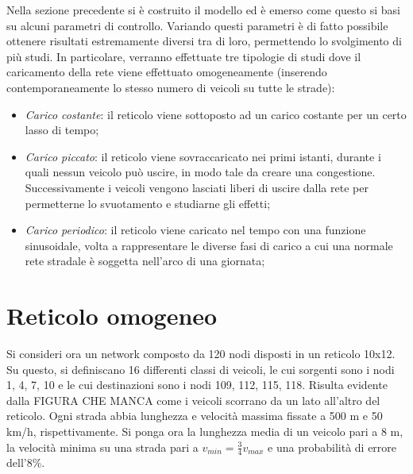 \documentclass[../main.tex]{subfiles}
\begin{document}
Nella sezione precedente si \`e costruito il modello ed \`e emerso come questo si basi su alcuni parametri di controllo.
Variando questi parametri \`e di fatto possibile ottenere risultati estremamente diversi tra di loro, permettendo lo svolgimento di pi\`u studi.
In particolare, verranno effettuate tre tipologie di studi dove il caricamento della rete viene effettuato omogeneamente (inserendo contemporaneamente lo stesso numero di veicoli su tutte le strade):
\begin{itemize}
    \item \emph{Carico costante}: il reticolo viene sottoposto ad un carico costante per un certo lasso di tempo;
    \item \emph{Carico piccato}: il reticolo viene sovraccaricato nei primi istanti, durante i quali nessun veicolo pu\`o uscire, in modo tale da creare una congestione. Successivamente i veicoli vengono lasciati liberi di uscire dalla rete per permetterne lo svuotamento e studiarne gli effetti;
    \item \emph{Carico periodico}: il reticolo viene caricato nel tempo con una funzione sinusoidale, volta a rappresentare le diverse fasi di carico a cui una normale rete stradale \`e soggetta nell'arco di una giornata;
\end{itemize}

\section{Reticolo omogeneo}
Si consideri ora un network composto da 120 nodi disposti in un reticolo 10x12.
Su questo, si definiscano 16 differenti classi di veicoli, le cui sorgenti sono i nodi 1, 4, 7, 10 e le cui destinazioni sono i nodi 109, 112, 115, 118.
Risulta evidente dalla FIGURA CHE MANCA come i veicoli scorrano da un lato all'altro del reticolo.
Ogni strada abbia lunghezza e velocit\`a massima fissate a 500 m e 50 km/h, rispettivamente.
Si ponga ora la lunghezza media di un veicolo pari a 8 m, la velocit\`a minima su una strada pari a $v_{min}=\frac{3}{4}v_{max}$ e una probabilit\`a di errore dell'8\%.
\end{document}
